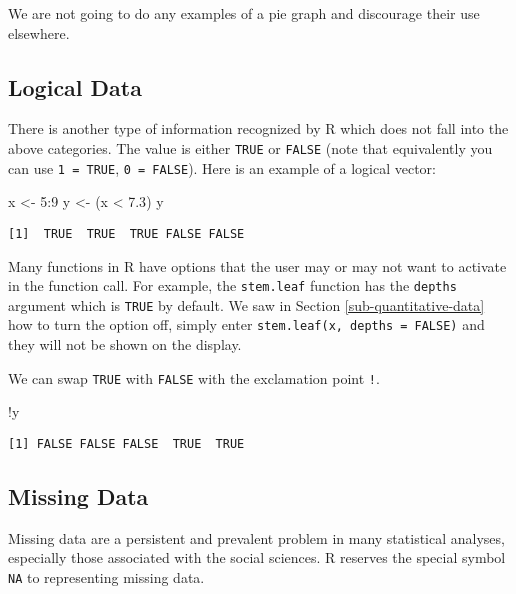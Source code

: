 \documentclass[]{book}
\newenvironment{Shaded}{\begin{snugshade}}{\end{snugshade}}
\newcommand{\DecValTok}[1]{\textcolor[rgb]{0.00,0.00,0.81}{{#1}}}
\newcommand{\FloatTok}[1]{\textcolor[rgb]{0.00,0.00,0.81}{{#1}}}
\newcommand{\StringTok}[1]{\textcolor[rgb]{0.31,0.60,0.02}{{#1}}}
\newcommand{\NormalTok}[1]{{#1}}
\numberwithin{equation}{chapter}
\numberwithin{figure}{chapter}
\theoremstyle{plain}
\theoremstyle{definition}
\theoremstyle{remark}
\theoremstyle{definition}
\theoremstyle{definition}
\theoremstyle{remark}
\begin{document}
We are not going to do any examples of a pie graph and discourage their
use elsewhere.

\subsection{Logical Data}\label{sub-logical-data}

There is another type of information recognized by R which does not fall
into the above categories. The value is either \texttt{TRUE} or
\texttt{FALSE} (note that equivalently you can use \texttt{1\ =\ TRUE},
\texttt{0\ =\ FALSE}). Here is an example of a logical vector:

\begin{Shaded}
\begin{Highlighting}[]
\NormalTok{x <-}\StringTok{ }\DecValTok{5}\NormalTok{:}\DecValTok{9}
\NormalTok{y <-}\StringTok{ }\NormalTok{(x <}\StringTok{ }\FloatTok{7.3}\NormalTok{)}
\NormalTok{y}
\end{Highlighting}
\end{Shaded}

\begin{verbatim}
[1]  TRUE  TRUE  TRUE FALSE FALSE
\end{verbatim}

Many functions in R have options that the user may or may not want to
activate in the function call. For example, the \texttt{stem.leaf}
function has the \texttt{depths} argument which is \texttt{TRUE} by
default. We saw in Section \ref{sub-quantitative-data} how to turn the
option off, simply enter \texttt{stem.leaf(x,\ depths\ =\ FALSE)} and
they will not be shown on the display.

We can swap \texttt{TRUE} with \texttt{FALSE} with the exclamation point
\texttt{!}.

\begin{Shaded}
\begin{Highlighting}[]
\NormalTok{!y}
\end{Highlighting}
\end{Shaded}

\begin{verbatim}
[1] FALSE FALSE FALSE  TRUE  TRUE
\end{verbatim}

\subsection{Missing Data}\label{sub-missing-data}

Missing data are a persistent and prevalent problem in many statistical
analyses, especially those associated with the social sciences. R
reserves the special symbol \texttt{NA} to representing missing data.
\end{document}
